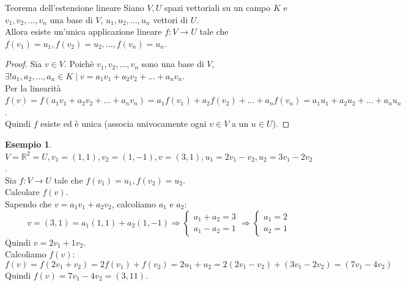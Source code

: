 \documentclass[a4paper]{article}
\theoremstyle{definition}
\newtheorem*{es}{Esempio}
\begin{document}
\begin{teo}{Teorema dell'estensione lineare}{}
	Siano $V, U$ spazi vettoriali su un campo $K$ e $v_1, v_2, ..., v_n$ una base di $V$,
	$u_1, u_2, ..., u_n$ vettori di $U$. \\
	Allora esiste un'unica applicazione lineare $f: V \rightarrow U$ tale che $f(v_1) = u_1, f(v_2) = u_2, ..., f(v_n) = u_n$.
\end{teo}
\begin{proof}
	Sia $v \in V$. Poichè $v_1, v_2, ..., v_n$ sono una base di $V$, $\exists! a_1, a_2, ..., a_n \in K \mid v = a_1v_1 + a_2v_2 + ... + a_nv_n$. \\
	Per la linearità $f(v) = f(a_1v_1 + a_2v_2 + ... + a_nv_n) = a_1f(v_1) + a_2f(v_2) + ... + a_nf(v_n) = a_1u_1 + a_2u_2 + ... + a_nu_n$. \\
	Quindi $f$ esiste ed è unica (associa univocamente ogni $v \in V$ a un $u \in U$).
\end{proof}

\begin{es}
	$V = \mathbb{R}^2 = U, v_1 = (1, 1), v_2 = (1, -1), v = (3, 1), u_1 = 2v_1 - v_2, u_2 = 3v_1 - 2v_2$. \\
	Sia $f: V \rightarrow U$ tale che $f(v_1) = u_1, f(v_2) = u_2$. \\
	Calcolare $f(v)$. \\
	Sapendo che $v = a_1v_1 + a_2v_2$, calcoliamo $a_1$ e $a_2$:
	\begin{equation*}
		v = (3, 1) = a_1(1, 1) + a_2(1, -1) \Rightarrow \begin{cases}
			              a_1 + a_2 = 3 \\
			              a_1 - a_2 = 1
		              \end{cases} \Rightarrow \begin{cases}
			            a_1 = 2 \\
			            a_2 = 1
		            \end{cases}
	\end{equation*}
	Quindi $v = 2v_1 + 1v_2$. \\
	Calcoliamo $f(v)$:
	\begin{equation*}
		f(v) = f(2v_1 + v_2) = 2f(v_1) + f(v_2) = 2u_1 + u_2 = 2(2v_1 - v_2) + (3v_1 - 2v_2) = (7v_1 - 4v_2)
	\end{equation*}
	Quindi $f(v) = 7v_1 - 4v_2 = (3, 11)$.
\end{es}
\end{document}
